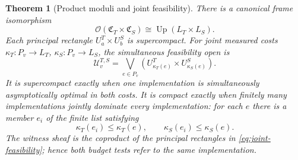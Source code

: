 \documentclass[11pt,a4paper]{article}
\numberwithin{algorithm}{section}
\numberwithin{equation}{section}
\newtheorem{theorem}{Theorem}[section]
\theoremstyle{definition}
\theoremstyle{remark}
\theoremstyle{plain}
\newcommand{\OO}{\mathcal O}
\newcommand{\Up}{\operatorname{Up}}
\theoremstyle{definition}
\theoremstyle{plain}
\begin{document}
\begin{theorem}[Product moduli and joint feasibility]
\label{thm:multi-resource}
There is a canonical frame isomorphism
\begin{equation}\label{eq:product-growth-frame}
 \OO(\mathfrak C_T\times\mathfrak C_S)
 \cong\Up(L_T\times L_S).
\end{equation}
Each principal rectangle $U_a^T\times U_b^S$ is
supercompact.  For joint measured costs
$\kappa_T:P_v\to L_T$, $\kappa_S:P_v\to L_S$, the
simultaneous feasibility open is
\begin{equation}\label{eq:joint-feasibility}
 \mathcal U_v^{T,S}=
 \bigvee_{e\in P_v}
    (U^T_{\kappa_T(e)}\times U^S_{\kappa_S(e)}).
\end{equation}
It is supercompact exactly when one implementation is
simultaneously asymptotically optimal in both costs.
It is compact exactly when finitely many implementations
jointly dominate every implementation: for each $e$ there
is a member $e_i$ of the finite list satisfying
\[
 \kappa_T(e_i)\le\kappa_T(e),\qquad
 \kappa_S(e_i)\le\kappa_S(e).
\]
The witness sheaf is the coproduct of the principal rectangles
in \eqref{eq:joint-feasibility}; hence both budget tests
refer to the same implementation.
\end{theorem}
\end{document}
